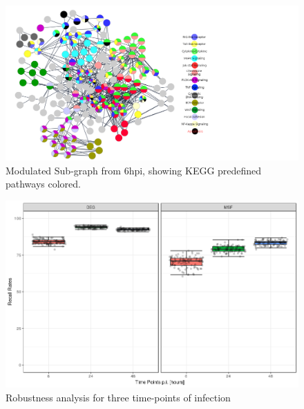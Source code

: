 \documentclass[twocolumn]{article}
\begin{document}
\begin{figure}
	\centering
	\includegraphics[width=1.6\linewidth]{Merged6hNetwork.png}
	\caption{Modulated Sub-graph from 6hpi, showing KEGG predefined pathways colored.}
	\label{fig:merged6hnetwork}
\end{figure}


\begin{figure}[p]
	\includegraphics[width=16cm]{DEGvsMSF2.png}
	\caption{Robustness analysis for three time-points of infection}
	\label{fig:degvsmsf2}
\end{figure}
\end{document}
